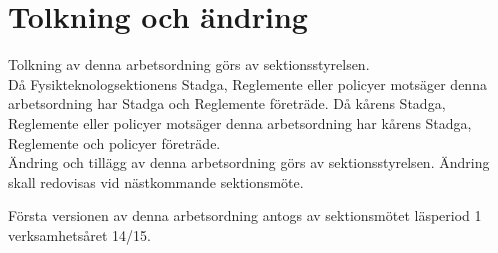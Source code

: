 \section{Tolkning och ändring}
Tolkning av denna arbetsordning görs av sektionsstyrelsen.\\ Då Fysikteknologsektionens Stadga, Reglemente eller policyer motsäger denna arbetsordning har Stadga och Reglemente företräde. Då kårens Stadga, Reglemente eller policyer motsäger denna arbetsordning har kårens Stadga, Reglemente och policyer företräde.\\
Ändring och tillägg av denna arbetsordning görs av sektionsstyrelsen. Ändring skall redovisas vid nästkommande sektionsmöte. 

Första versionen av denna arbetsordning antogs av sektionsmötet läsperiod 1 verksamhetsåret 14/15.

\newpage
